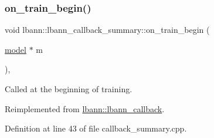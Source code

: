 \mbox{\label{classlbann_1_1lbann__callback__summary_a1ff0c4368aee47c294b9c11a5176b9e0}} 
\subsubsection{\texorpdfstring{on\+\_\+train\+\_\+begin()}{on\_train\_begin()}}
{\footnotesize\ttfamily void lbann\+::lbann\+\_\+callback\+\_\+summary\+::on\+\_\+train\+\_\+begin (\begin{DoxyParamCaption}\item[{\hyperlink{classlbann_1_1model}{model} $\ast$}]{m }\end{DoxyParamCaption})\hspace{0.3cm}{\ttfamily [override]}, {\ttfamily [virtual]}}

Called at the beginning of training. 

Reimplemented from \hyperlink{classlbann_1_1lbann__callback_a7c8f0d211967ccc5219144e92571ab26}{lbann\+::lbann\+\_\+callback}.



Definition at line 43 of file callback\+\_\+summary.\+cpp.


